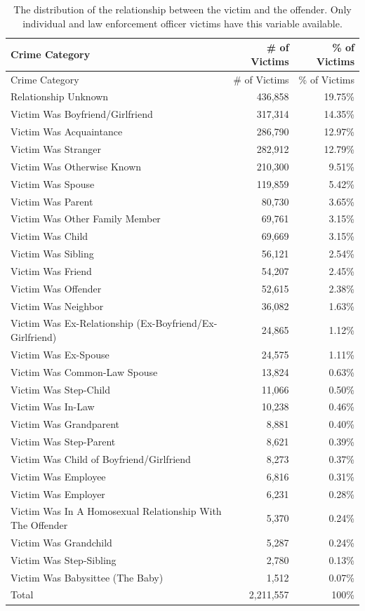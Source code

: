 \documentclass[
  12pt,
  openany]{book}
\begin{document}
\begin{longtable}[]{@{}lrr@{}}
\caption{\label{tab:victimRelationship}The distribution of the relationship between the victim and the offender. Only individual and law enforcement officer victims have this variable available.}\tabularnewline
\toprule
Crime Category & \# of Victims & \% of Victims\tabularnewline
\midrule
\endfirsthead
\toprule
Crime Category & \# of Victims & \% of Victims\tabularnewline
\midrule
\endhead
Relationship Unknown & 436,858 & 19.75\%\tabularnewline
Victim Was Boyfriend/Girlfriend & 317,314 & 14.35\%\tabularnewline
Victim Was Acquaintance & 286,790 & 12.97\%\tabularnewline
Victim Was Stranger & 282,912 & 12.79\%\tabularnewline
Victim Was Otherwise Known & 210,300 & 9.51\%\tabularnewline
Victim Was Spouse & 119,859 & 5.42\%\tabularnewline
Victim Was Parent & 80,730 & 3.65\%\tabularnewline
Victim Was Other Family Member & 69,761 & 3.15\%\tabularnewline
Victim Was Child & 69,669 & 3.15\%\tabularnewline
Victim Was Sibling & 56,121 & 2.54\%\tabularnewline
Victim Was Friend & 54,207 & 2.45\%\tabularnewline
Victim Was Offender & 52,615 & 2.38\%\tabularnewline
Victim Was Neighbor & 36,082 & 1.63\%\tabularnewline
Victim Was Ex-Relationship (Ex-Boyfriend/Ex-Girlfriend) & 24,865 & 1.12\%\tabularnewline
Victim Was Ex-Spouse & 24,575 & 1.11\%\tabularnewline
Victim Was Common-Law Spouse & 13,824 & 0.63\%\tabularnewline
Victim Was Step-Child & 11,066 & 0.50\%\tabularnewline
Victim Was In-Law & 10,238 & 0.46\%\tabularnewline
Victim Was Grandparent & 8,881 & 0.40\%\tabularnewline
Victim Was Step-Parent & 8,621 & 0.39\%\tabularnewline
Victim Was Child of Boyfriend/Girlfriend & 8,273 & 0.37\%\tabularnewline
Victim Was Employee & 6,816 & 0.31\%\tabularnewline
Victim Was Employer & 6,231 & 0.28\%\tabularnewline
Victim Was In A Homosexual Relationship With The Offender & 5,370 & 0.24\%\tabularnewline
Victim Was Grandchild & 5,287 & 0.24\%\tabularnewline
Victim Was Step-Sibling & 2,780 & 0.13\%\tabularnewline
Victim Was Babysittee (The Baby) & 1,512 & 0.07\%\tabularnewline
Total & 2,211,557 & 100\%\tabularnewline
\bottomrule
\end{longtable}

\end{document}
